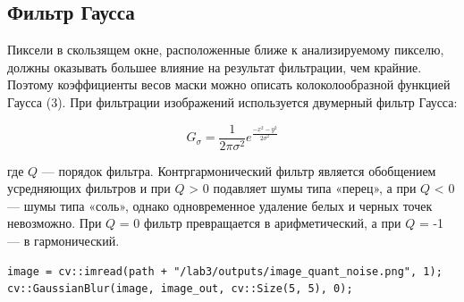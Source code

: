 \pagebreak

\subsection{Фильтр Гаусса}

Пиксели в скользящем окне, расположенные ближе к анализируемому пикселю, должны оказывать большее влияние на результат 
фильтрации, чем крайние. Поэтому коэффициенты весов маски можно описать колоколообразной функцией Гаусса (3). При
фильтрации изображений используется двумерный фильтр Гаусса:



\begin{equation}
    G_\sigma = \frac{1}{2\pi\sigma^2} e ^{\frac{-x^2-y^2}{2\sigma^2}}
\label{eq:complex_func}
\end{equation}

где $Q$ — порядок фильтра. Контргармонический фильтр является
обобщением усредняющих фильтров и при $Q$ > 0 подавляет шумы
типа «перец», а при $Q$ < 0 — шумы типа «соль», однако одновременное удаление 
белых и черных точек невозможно. При $Q$ = 0 фильтр превращается в арифметический, 
а при $Q$ = -1 — в гармонический.

\pagebreak

\begin{lstlisting}[style=cpp_white, caption={Исходный код фильра Гаусса}]
image = cv::imread(path + "/lab3/outputs/image_quant_noise.png", 1);
cv::GaussianBlur(image, image_out, cv::Size(5, 5), 0);
\end{lstlisting}

